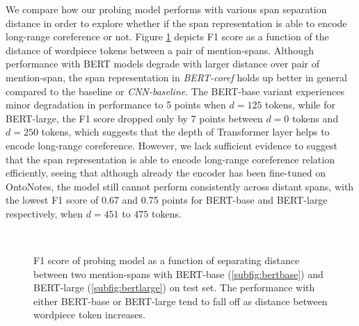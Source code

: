 \documentclass[11pt]{article}
\begin{document}
We compare how our probing model performs with various span separation distance in order to explore whether if the span representation is able to encode long-range coreference or not. Figure \ref{fig:longrange_result} depicts F1 score as a function of the distance of wordpiece tokens between a pair of mention-spans. Although performance with BERT models degrade with larger distance over pair of mention-span, the span representation in \textit{BERT-coref} holds up better in general compared to the baseline or \textit{CNN-baseline}. The BERT-base variant experiences minor degradation in performance to 5 points when $d=125$ tokens, while for BERT-large, the F1 score dropped only by 7 points between $d=0$ tokens and $d=250$ tokens, which suggests that the depth of Transformer layer helps to encode long-range coreference. However, we lack sufficient evidence to suggest that the span representation is able to encode long-range coreference relation efficiently, seeing that although already the encoder has been fine-tuned on OntoNotes, the model still cannot perform consistently across distant spans, with the lowest F1 score of 0.67 and 0.75 points for BERT-base and BERT-large respectively, when $d=451$ to $475$ tokens.
\begin{figure}[ht]
 \\
  \caption{F1 score of probing model as a function of separating distance between two mention-spans with BERT-base (\ref{subfig:bertbase}) and BERT-large (\ref{subfig:bertlarge}) on test set. The performance with either BERT-base or BERT-large tend to fall off as distance between wordpiece token increases.}
  \label{fig:longrange_result} 
\end{figure}
\end{document}
